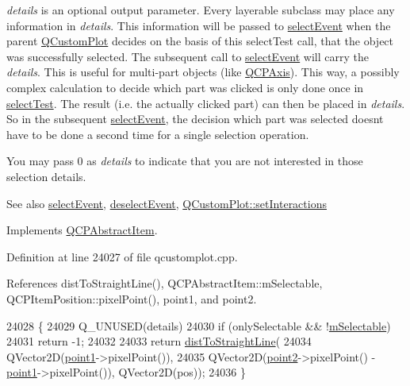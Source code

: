 {\itshape details} is an optional output parameter. Every layerable subclass may place any information in {\itshape details}. This information will be passed to \hyperlink{class_q_c_p_abstract_item_aaf92af7b9893712959a6c073d334d88d}{select\+Event} when the parent \hyperlink{class_q_custom_plot}{Q\+Custom\+Plot} decides on the basis of this select\+Test call, that the object was successfully selected. The subsequent call to \hyperlink{class_q_c_p_abstract_item_aaf92af7b9893712959a6c073d334d88d}{select\+Event} will carry the {\itshape details}. This is useful for multi-\/part objects (like \hyperlink{class_q_c_p_axis}{Q\+C\+P\+Axis}). This way, a possibly complex calculation to decide which part was clicked is only done once in \hyperlink{class_q_c_p_item_straight_line_a64cc3796f58ce856012732603edb2f1c}{select\+Test}. The result (i.\+e. the actually clicked part) can then be placed in {\itshape details}. So in the subsequent \hyperlink{class_q_c_p_abstract_item_aaf92af7b9893712959a6c073d334d88d}{select\+Event}, the decision which part was selected doesn\textquotesingle{}t have to be done a second time for a single selection operation.

You may pass 0 as {\itshape details} to indicate that you are not interested in those selection details.

\begin{DoxySeeAlso}{See also}
\hyperlink{class_q_c_p_abstract_item_aaf92af7b9893712959a6c073d334d88d}{select\+Event}, \hyperlink{class_q_c_p_abstract_item_a91f090d6763cfedb0749219c63788ae9}{deselect\+Event}, \hyperlink{class_q_custom_plot_a5ee1e2f6ae27419deca53e75907c27e5}{Q\+Custom\+Plot\+::set\+Interactions} 
\end{DoxySeeAlso}


Implements \hyperlink{class_q_c_p_abstract_item_a96d522d10ffc0413b9a366c6f7f0476b}{Q\+C\+P\+Abstract\+Item}.



Definition at line 24027 of file qcustomplot.\+cpp.



References dist\+To\+Straight\+Line(), Q\+C\+P\+Abstract\+Item\+::m\+Selectable, Q\+C\+P\+Item\+Position\+::pixel\+Point(), point1, and point2.


\begin{DoxyCode}
24028                                                                 \{
24029   Q\_UNUSED(details)
24030   if (onlySelectable && !\hyperlink{class_q_c_p_abstract_item_ad81eb35c8726a0f458db9df9732e0e41}{mSelectable})
24031     return -1;
24032 
24033   return \hyperlink{class_q_c_p_item_straight_line_adc9b6c5bd33c7f806b748b79dfa25926}{distToStraightLine}(
24034       QVector2D(\hyperlink{class_q_c_p_item_straight_line_ac131a6ffe456f2cc7364dce541fe0120}{point1}->pixelPoint()),
24035       QVector2D(\hyperlink{class_q_c_p_item_straight_line_ad26c0a732e471f63f75d481dcd48cfc9}{point2}->pixelPoint() - \hyperlink{class_q_c_p_item_straight_line_ac131a6ffe456f2cc7364dce541fe0120}{point1}->pixelPoint()), QVector2D(pos));
24036 \}
\end{DoxyCode}


